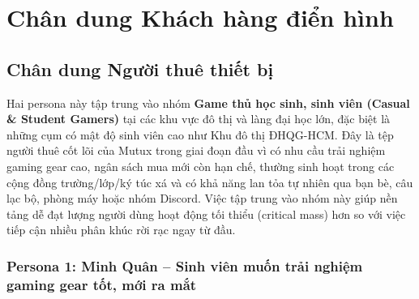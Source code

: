 \section{Chân dung Khách hàng điển hình}

\subsection{Chân dung Người thuê thiết bị}

Hai persona này tập trung vào nhóm \textbf{Game thủ học sinh, sinh viên (Casual \& Student Gamers)} tại các khu vực đô thị và làng đại học lớn, đặc biệt là những cụm có mật độ sinh viên cao như Khu đô thị ĐHQG-HCM. Đây là tệp người thuê cốt lõi của Mutux trong giai đoạn đầu vì có nhu cầu trải nghiệm gaming gear cao, ngân sách mua mới còn hạn chế, thường sinh hoạt trong các cộng đồng trường/lớp/ký túc xá và có khả năng lan tỏa tự nhiên qua bạn bè, câu lạc bộ, phòng máy hoặc nhóm Discord. Việc tập trung vào nhóm này giúp nền tảng dễ đạt lượng người dùng hoạt động tối thiểu (critical mass) hơn so với việc tiếp cận nhiều phân khúc rời rạc ngay từ đầu.

\subsubsection{Persona 1: Minh Quân -- Sinh viên muốn trải nghiệm gaming gear tốt, mới ra mắt}

